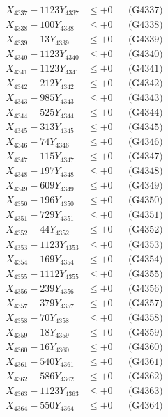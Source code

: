 \documentclass[a4paper,10pt]{article}
\begin{document}
{\begin{align}
X_{4337} - 1123Y_{4337} &\leq +0 && \text{(G4337)} \\
X_{4338} - 100Y_{4338} &\leq +0 && \text{(G4338)} \\
X_{4339} - 13Y_{4339} &\leq +0 && \text{(G4339)} \\
X_{4340} - 1123Y_{4340} &\leq +0 && \text{(G4340)} \\
\allowbreak
X_{4341} - 1123Y_{4341} &\leq +0 && \text{(G4341)} \\
X_{4342} - 212Y_{4342} &\leq +0 && \text{(G4342)} \\
X_{4343} - 985Y_{4343} &\leq +0 && \text{(G4343)} \\
X_{4344} - 525Y_{4344} &\leq +0 && \text{(G4344)} \\
X_{4345} - 313Y_{4345} &\leq +0 && \text{(G4345)} \\
X_{4346} - 74Y_{4346} &\leq +0 && \text{(G4346)} \\
X_{4347} - 115Y_{4347} &\leq +0 && \text{(G4347)} \\
X_{4348} - 197Y_{4348} &\leq +0 && \text{(G4348)} \\
X_{4349} - 609Y_{4349} &\leq +0 && \text{(G4349)} \\
X_{4350} - 196Y_{4350} &\leq +0 && \text{(G4350)} \\
\allowbreak
X_{4351} - 729Y_{4351} &\leq +0 && \text{(G4351)} \\
X_{4352} - 44Y_{4352} &\leq +0 && \text{(G4352)} \\
X_{4353} - 1123Y_{4353} &\leq +0 && \text{(G4353)} \\
X_{4354} - 169Y_{4354} &\leq +0 && \text{(G4354)} \\
X_{4355} - 1112Y_{4355} &\leq +0 && \text{(G4355)} \\
X_{4356} - 239Y_{4356} &\leq +0 && \text{(G4356)} \\
X_{4357} - 379Y_{4357} &\leq +0 && \text{(G4357)} \\
X_{4358} - 70Y_{4358} &\leq +0 && \text{(G4358)} \\
X_{4359} - 18Y_{4359} &\leq +0 && \text{(G4359)} \\
X_{4360} - 16Y_{4360} &\leq +0 && \text{(G4360)} \\
\allowbreak
X_{4361} - 540Y_{4361} &\leq +0 && \text{(G4361)} \\
X_{4362} - 586Y_{4362} &\leq +0 && \text{(G4362)} \\
X_{4363} - 1123Y_{4363} &\leq +0 && \text{(G4363)} \\
X_{4364} - 550Y_{4364} &\leq +0 && \text{(G4364)} \\

\end{align}}
\end{document}
